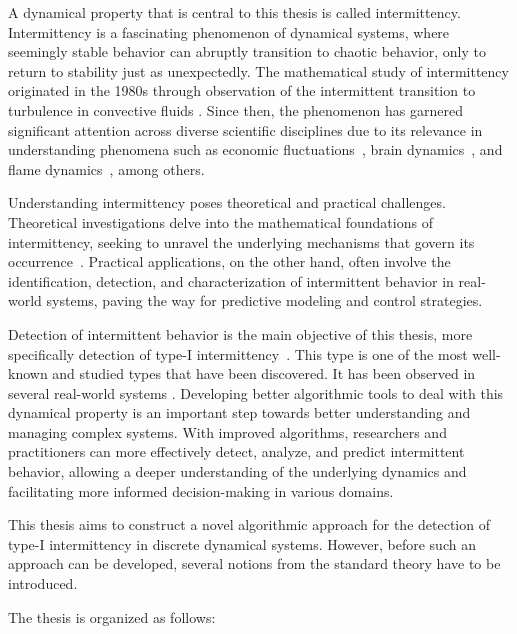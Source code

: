 A dynamical property that is central to this thesis is called intermittency.
Intermittency is a fascinating phenomenon of dynamical systems, where seemingly stable behavior can abruptly transition to chaotic behavior, only to return to stability just as unexpectedly.
The mathematical study of intermittency originated in the 1980s through observation of the intermittent transition to turbulence in convective fluids \cite{Pomeau1980}.
Since then, the phenomenon has garnered significant attention across diverse scientific disciplines due to its relevance in understanding phenomena such as economic fluctuations~\cite{Chian2007}, brain dynamics~\cite{Paradisi2013}, and flame dynamics~\cite{Pizza20110926}, among others.
\par
Understanding intermittency poses theoretical and practical challenges.
Theoretical investigations delve into the mathematical foundations of intermittency, seeking to unravel the underlying mechanisms that govern its occurrence~\cite{Elaskar2017, Elaskar2023}.
Practical applications, on the other hand, often involve the identification, detection, and characterization of intermittent behavior in real-world systems, paving the way for predictive modeling and control strategies.
\par
Detection of intermittent behavior is the main objective of this thesis, more specifically detection of type-I intermittency~\cite{Pomeau1980,Bussac1982,DelRio2014}.
This type is one of the most well-known and studied types that have been discovered.
It has been observed in several real-world systems \cite{Zebrowski2004,Parthimos2001,Dimitriu2008,Chiriac20070701}.
Developing better algorithmic tools to deal with this dynamical property is an important step towards better understanding and managing complex systems.
With improved algorithms, researchers and practitioners can more effectively detect, analyze, and predict intermittent behavior, allowing a deeper understanding of the underlying dynamics and facilitating more informed decision-making in various domains.

\bigskip

This thesis aims to construct a novel algorithmic approach for the detection of type-I intermittency in discrete dynamical systems.
However, before such an approach can be developed, several notions from the standard theory have to be introduced.
\par
The thesis is organized as follows:

